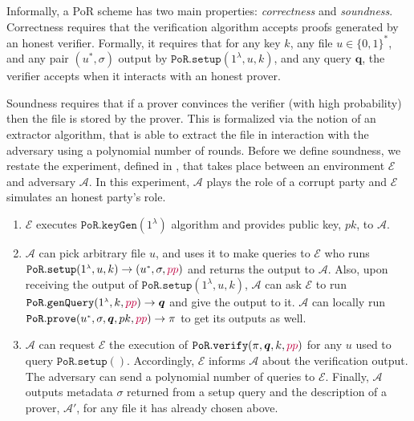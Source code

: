 Informally, a PoR scheme has two main properties: \emph{correctness} and \emph{soundness}. Correctness requires that the verification algorithm accepts  proofs generated by an honest verifier. Formally, it requires that for any key $k$, any file $u\in\{0,1\}^{\scriptscriptstyle *}$, and any  pair $(u^{*},\sigma)$ output by $\mathtt{PoR.setup}(1^{\scriptscriptstyle\lambda}, u,k)$, and any query $\bm{q}$, the verifier  accepts when it interacts with an honest prover.

 Soundness requires that if a prover convinces the verifier (with high probability) then the file is stored by the prover. This is formalized via the notion of an extractor algorithm, that is able to extract the file in interaction with the adversary using a polynomial number of  rounds. Before we define  soundness, we restate the  experiment, defined in \cite{DBLP:conf/asiacrypt/ShachamW08}, that takes place between an environment $\mathcal{E}$ and  adversary $\mathcal{A}$. In this experiment, $\mathcal{A}$ plays the role of a corrupt party and $\mathcal{E}$ simulates an honest party's role. 


\begin{enumerate}
\item $\mathcal{E}$ executes $\mathtt{PoR.keyGen}(1^{\scriptscriptstyle\lambda})$ algorithm and provides public key, $pk$, to $\mathcal{A}$.   
\item $\mathcal{A}$ can pick  arbitrary file $u$, and  uses it to make queries to  $\mathcal{E}$ who runs  $\mathtt{PoR.setup}(1^{\scriptscriptstyle\lambda}, u,k)\rightarrow (u^{\scriptscriptstyle *}, \sigma, {\color{purple}pp})$   and returns the output to $\mathcal{A}$. Also, upon receiving the output of $\mathtt{PoR.setup}(1^{\scriptscriptstyle\lambda}, u,k)$, $\mathcal{A}$ can ask $\mathcal{E}$  to run   $\mathtt{PoR.genQuery}(1^{\scriptscriptstyle\lambda},k,{\color{purple}pp})\rightarrow \bm{q}$ and give the output to it. $\mathcal{A}$ can locally run $\mathtt{PoR.prove}(u^{\scriptscriptstyle *}, \sigma, \bm{q},pk,{\color{purple}pp})\rightarrow \pi$ to get its outputs as well. 
\item $\mathcal{A}$ can request $\mathcal{E}$ the execution of $\mathtt{PoR.verify}(\pi,\bm{q},k,{\color{purple}pp})$ for any $u$ used to query $\mathtt{PoR.setup}()$. Accordingly, $\mathcal{E}$ informs  $\mathcal{A}$ about the verification output. The adversary can send a polynomial number of queries to $\mathcal{E}$. Finally, $\mathcal{A}$ outputs metadata $\sigma$ returned from a setup query and the description of a prover, $\mathcal{A}'$, for any file it has already chosen above. 
\end{enumerate}

